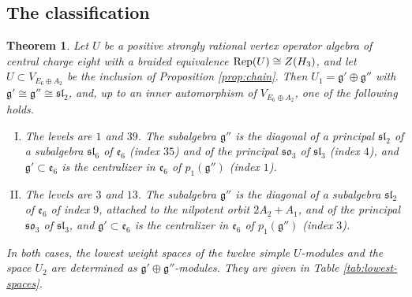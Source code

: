 \documentclass[leqno]{article}
\let\cal\relax
\newcommand{\cal}{\mathcal}
\DeclareMathOperator{\Rep}{Rep}
\newtheorem{thm}{Theorem}[section]
\numberwithin{equation}{section}
\begin{document}
\subsection{The classification}

\begin{thm}
\label{thm:weight-one-classification}
Let $U$ be a positive strongly rational vertex operator algebra of central charge eight with a braided equivalence $\Rep(U) \cong Z(\cal H_3)$, and let $U \subset V_{E_6 \oplus A_2}$ be the inclusion of Proposition \ref{prop:chain}. Then $U_1 = \mathfrak g' \oplus \mathfrak g''$ with $\mathfrak g' \cong \mathfrak g'' \cong \mathfrak{sl}_2$, and, up to an inner automorphism of $V_{E_6 \oplus A_2}$, one of the following holds.
\begin{enumerate}[(I)]
\item The levels are $1$ and $39$. The subalgebra $\mathfrak g''$ is the diagonal of a principal $\mathfrak{sl}_2$ of a subalgebra $\mathfrak{sl}_6$ of $\mathfrak e_6$ (index $35$) and of the principal $\mathfrak{so}_3$ of $\mathfrak{sl}_3$ (index $4$), and $\mathfrak g' \subset \mathfrak e_6$ is the centralizer in $\mathfrak e_6$ of $p_1(\mathfrak g'')$ (index $1$).
\item The levels are $3$ and $13$. The subalgebra $\mathfrak g''$ is the diagonal of a subalgebra $\mathfrak{sl}_2$ of $\mathfrak e_6$ of index $9$, attached to the nilpotent orbit $2A_2+A_1$, and of the principal $\mathfrak{so}_3$ of $\mathfrak{sl}_3$, and $\mathfrak g' \subset \mathfrak e_6$ is the centralizer in $\mathfrak e_6$ of $p_1(\mathfrak g'')$ (index $3$).
\end{enumerate}
In both cases, the lowest weight spaces of the twelve simple $U$-modules and the space $U_2$ are determined as $\mathfrak g' \oplus \mathfrak g''$-modules. They are given in Table \ref{tab:lowest-spaces}.
\end{thm}
\end{document}
